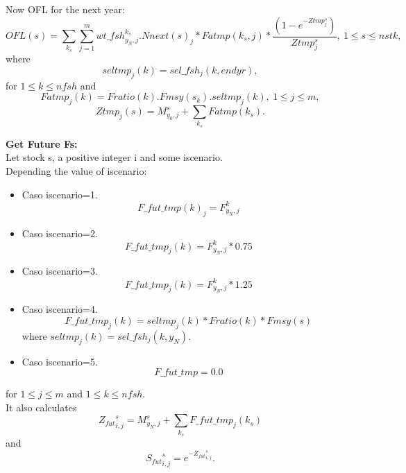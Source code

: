 \documentclass{article}
\begin{document}
Now OFL for the next year:
\begin{equation}
    OFL(s) =\sum_{k_s} \sum_{j=1}^mwt\_fsh^{k_s}_{y_N,j} . Nnext(s)_j * Fatmp(k_s,j) * \dfrac{(1 - e^{-Ztmp^s_j})}{Ztmp^s_j}, \ 1\leq s \leq nstk,
\end{equation}
where
\begin{equation}
    seltmp_j(k)=sel\_fsh_j(k,endyr),
\end{equation}
for $1\leq k \leq nfsh$ and
\begin{equation}
    Fatmp_j(k)=Fratio(k).Fmsy(s_k).seltmp_j(k), \  1\leq j \leq m,
\end{equation}
\begin{equation}
    Ztmp_j(s)=M^s_{y_0,j}+ \sum_{k_s}Fatmp(k_s).
\end{equation}

\textbf{Get Future Fs:}\\
Let stock s, a positive integer i and some iscenario.\\
Depending the value of iscenario:
\begin{itemize}
    \item Caso iscenario=1. \begin{equation}
        F\_fut\_tmp(k)_j=F^k_{y_N,j}
    \end{equation}
    \item Caso iscenario=2.  \begin{equation}
        F\_fut\_tmp_j(k) = F^k_{y_N,j}*0.75
    \end{equation}
    \item Caso iscenario=3.  \begin{equation}
        F\_fut\_tmp_j(k) = F^{k}_{y_N,j}*1.25
    \end{equation}
    \item Caso iscenario=4.
    \begin{equation}
        F\_fut\_tmp_j(k)=seltmp_j(k)*Fratio(k)*Fmsy(s)
    \end{equation}
    where $seltmp_j(k)=sel\_fsh_j(k,y_N)$.
    \item Caso iscenario=5.
    \begin{equation}
        F\_fut\_tmp = 0.0
    \end{equation}
\end{itemize}
for $1\leq j \leq m$ and  $1\leq k \leq nfsh$.\\
It also calculates
\begin{equation}
    {Z_{fut}}^s_{i,j}=M^s_{y_N,j}+\sum_{k_s}F\_fut\_tmp_j(k_s)
\end{equation}
and 
\begin{equation}
    {S_{fut}}^s_{i,j}=e^{-{Z_{fut}}^s_{i,j}}.
\end{equation}
\end{document}
